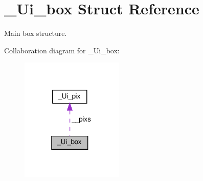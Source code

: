 \hypertarget{struct__Ui__box}{}\section{\+\_\+\+Ui\+\_\+box Struct Reference}
\label{struct__Ui__box}


Main box structure.  




Collaboration diagram for \+\_\+\+Ui\+\_\+box\+:\nopagebreak
\begin{figure}[H]
\begin{center}
\leavevmode
\includegraphics[width=139pt]{struct__Ui__box__coll__graph}
\end{center}
\end{figure}
